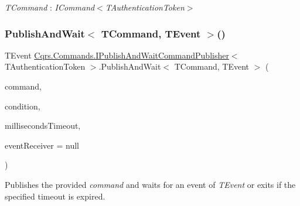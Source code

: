 \begin{Desc}
\item[Type Constraints]\begin{description}
\item[{\em T\+Command} : {\em I\+Command$<$T\+Authentication\+Token$>$}]\end{description}
\end{Desc}
\mbox{\label{interfaceCqrs_1_1Commands_1_1IPublishAndWaitCommandPublisher_a4b6636f2dba029321c62a78c473590be_a4b6636f2dba029321c62a78c473590be}} 
\subsubsection{\texorpdfstring{Publish\+And\+Wait$<$ T\+Command, T\+Event $>$()}{PublishAndWait< TCommand, TEvent >()}\hspace{0.1cm}{\footnotesize\ttfamily [5/6]}}
{\footnotesize\ttfamily T\+Event \hyperlink{interfaceCqrs_1_1Commands_1_1IPublishAndWaitCommandPublisher}{Cqrs.\+Commands.\+I\+Publish\+And\+Wait\+Command\+Publisher}$<$ T\+Authentication\+Token $>$.Publish\+And\+Wait$<$ T\+Command, T\+Event $>$ (\begin{DoxyParamCaption}\item[{T\+Command}]{command,  }\item[{Func$<$ I\+Enumerable$<$ \hyperlink{interfaceCqrs_1_1Events_1_1IEvent}{I\+Event}$<$ T\+Authentication\+Token $>$$>$, T\+Event $>$}]{condition,  }\item[{int}]{milliseconds\+Timeout,  }\item[{\hyperlink{interfaceCqrs_1_1Events_1_1IEventReceiver}{I\+Event\+Receiver}$<$ T\+Authentication\+Token $>$}]{event\+Receiver = {\ttfamily null} }\end{DoxyParamCaption})}



Publishes the provided {\itshape command}  and waits for an event of {\itshape T\+Event}  or exits if the specified timeout is expired. 


